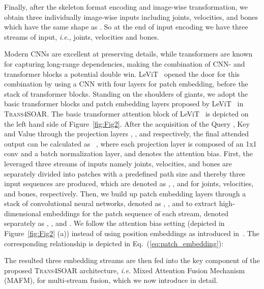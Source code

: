 \documentclass[lettersize,journal]{IEEEtran}
\begin{document}
Finally, after the skeleton format encoding and image-wise transformation, we obtain three individually image-wise inputs including joints, velocities, and bones which have the same shape as . So at the end of input encoding we have three streams of input, \textit{i.e.}, joints, velocities and bones.

Modern CNNs are excellent at preserving details, while transformers are known for capturing long-range dependencies, making the combination of CNN- and transformer blocks a potential double win.
LeViT~\cite{graham2021levit} opened the door for this combination by using a CNN with four layers for patch embedding, before the stack of transformer blocks.
Standing on the shoulders of giants, we adopt the basic transformer blocks and patch embedding layers proposed by LeViT~\cite{graham2021levit} in \textsc{Trans4SOAR}.
The basic transformer attention block of LeViT~\cite{graham2021levit} is depicted on the left hand side of Figure~\ref{fig:Fig2}.
After the acquisition of the Query , Key  and Value  through the projection layers , , and  respectively, the final attended output can be calculated as~ , where each projection layer is composed of an 1x1 conv and a batch normalization layer, and  denotes the attention bias.
First, the leveraged three streams of inputs namely joints, velocities, and bones are separately divided into  patches with a predefined path size  and thereby three input sequences are produced, which are denoted as , , and  for joints, velocities, and bones, respectively.
Then, we build up patch embedding layers through a stack of convolutional neural networks, denoted as , , and  to extract high-dimensional embeddings for the patch sequence of each stream, denoted separately as , , and . We follow the attention bias setting (depicted in Figure~\ref{fig:Fig2} (a)) instead of using position embeddings as introduced in~\cite{graham2021levit}.
The corresponding relationship is depicted in Eq.~(\ref{eq:patch_embedding}):

The resulted three embedding streams are then fed into the key component of the proposed \textsc{Trans4SOAR} architecture, \textit{i.e.} Mixed Attention Fusion Mechanism (MAFM), for multi-stream fusion, which we now introduce in detail.
\end{document}
